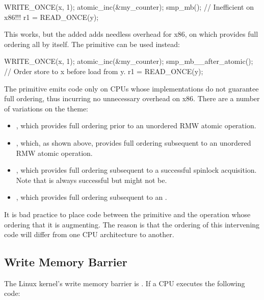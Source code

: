 \begin{VerbatimU}
	WRITE_ONCE(x, 1);
	atomic_inc(&my_counter);
	smp_mb(); // Inefficient on x86!!!
	r1 = READ_ONCE(y);
\end{VerbatimU}

This works, but the added  adds needless overhead for
x86, on which  provides full ordering all by itself.
The  primitive can be used instead:

\begin{VerbatimU}
	WRITE_ONCE(x, 1);
	atomic_inc(&my_counter);
	smp_mb__after_atomic(); // Order store to x before load from y.
	r1 = READ_ONCE(y);
\end{VerbatimU}

The  primitive emits code only on CPUs whose
 implementations do not guarantee full ordering, thus
incurring no unnecessary overhead on x86.
There are a number of variations on the  theme:

\begin{itemize}
 \item	{}, which provides full ordering prior
	to an unordered RMW atomic operation.

 \item	{}, which, as shown above, provides full
	ordering subsequent to an unordered RMW atomic operation.

 \item	{}, which provides full ordering subsequent
	to a successful spinlock acquisition.
	Note that  is always successful but 
	might not be.

 \item	{}, which provides full ordering
	subsequent to an .
\end{itemize}

It is bad practice to place code between the  primitive and the
operation whose ordering that it is augmenting.
The reason is that the ordering of this intervening code will differ from
one CPU architecture to another.


\subsection{Write Memory Barrier}

The Linux kernel's write memory barrier is .
If a CPU executes the following code:

